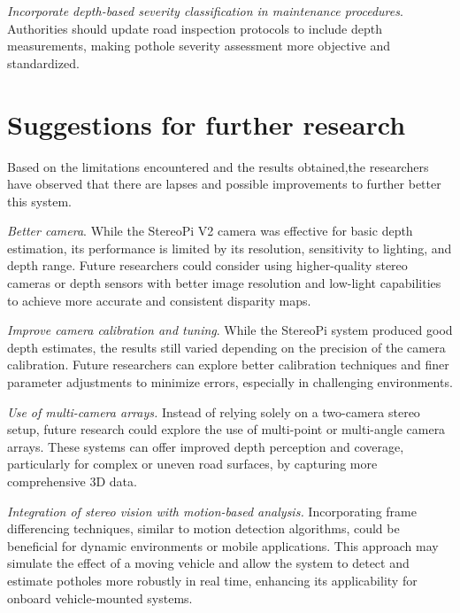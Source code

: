 \textit{Incorporate depth-based severity classification in maintenance procedures}. Authorities should update road inspection protocols to include depth measurements, making pothole severity assessment more objective and standardized.


\section{Suggestions for further research}

Based on the limitations encountered and the results obtained,the researchers have
observed that there are lapses and possible improvements to further better this system.

\textit{Better camera}. While the StereoPi V2 camera was effective for basic depth estimation, its performance is limited by its resolution, sensitivity to lighting, and depth range. Future researchers could consider using higher-quality stereo cameras or depth sensors with better image resolution and low-light capabilities to achieve more accurate and consistent disparity maps.
	
\textit{Improve camera calibration and tuning}. While the StereoPi system produced good depth estimates, the results still varied depending on the precision of the camera calibration. Future researchers can explore better calibration techniques and finer parameter adjustments to minimize errors, especially in challenging environments.

\textit{Use of multi-camera arrays.} Instead of relying solely on a two-camera stereo setup, future research could explore the use of multi-point or multi-angle camera arrays. These systems can offer improved depth perception and coverage, particularly for complex or uneven road surfaces, by capturing more comprehensive 3D data.

\textit{Integration of stereo vision with motion-based analysis.} Incorporating frame differencing techniques, similar to motion detection algorithms, could be beneficial for dynamic environments or mobile applications. This approach may simulate the effect of a moving vehicle and allow the system to detect and estimate potholes more robustly in real time, enhancing its applicability for onboard vehicle-mounted systems.
